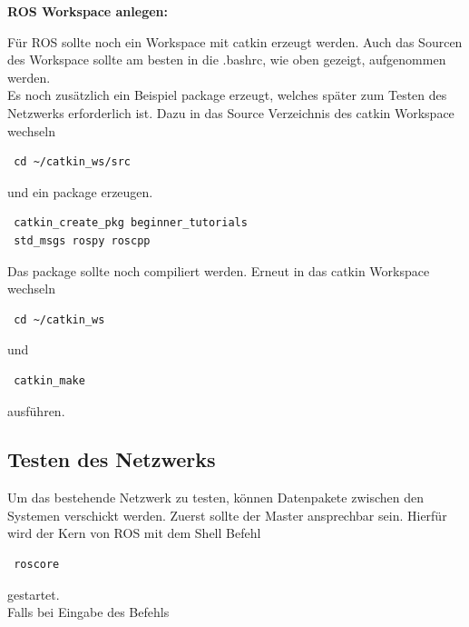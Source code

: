\documentclass[12pt]{article}
\begin{document}
{\bf ROS Workspace anlegen:}

Für ROS sollte noch ein Workspace mit catkin erzeugt werden. \cite{Workspace}
Auch das Sourcen des Workspace sollte am besten in die .bashrc, wie oben gezeigt, aufgenommen werden. \\
Es noch zusätzlich ein Beispiel package erzeugt, welches später zum Testen des Netzwerks erforderlich ist.
Dazu in das Source Verzeichnis des catkin Workspace wechseln

 \begin{lstlisting}
 cd ~/catkin_ws/src
 \end{lstlisting}

und ein package erzeugen. 

 \begin{lstlisting}
 catkin_create_pkg beginner_tutorials
 std_msgs rospy roscpp
 \end{lstlisting}

Das package sollte noch compiliert werden.
Erneut in  das catkin Workspace wechseln

 \begin{lstlisting}
 cd ~/catkin_ws
 \end{lstlisting}

und  
 
 \begin{lstlisting}
 catkin_make
 \end{lstlisting}
 
ausführen.
\subsection{Testen des Netzwerks}

Um das bestehende Netzwerk zu testen, können Datenpakete zwischen den Systemen verschickt werden.
Zuerst sollte der Master ansprechbar sein.
Hierfür wird der Kern von ROS mit dem Shell Befehl 

 \begin{lstlisting}
 roscore
 \end{lstlisting}

gestartet. \\
Falls bei Eingabe des Befehls
\end{document}
